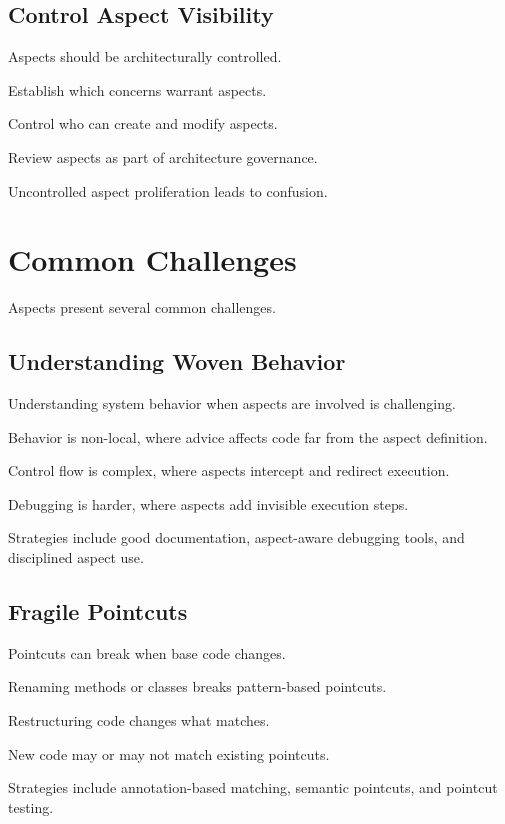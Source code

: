 \documentclass[11pt]{article}
\begin{document}
\subsection{Control Aspect Visibility}

Aspects should be architecturally controlled.

Establish which concerns warrant aspects.

Control who can create and modify aspects.

Review aspects as part of architecture governance.

Uncontrolled aspect proliferation leads to confusion.

\section{Common Challenges}

Aspects present several common challenges.

\subsection{Understanding Woven Behavior}

Understanding system behavior when aspects are involved is challenging.

Behavior is non-local, where advice affects code far from the aspect definition.

Control flow is complex, where aspects intercept and redirect execution.

Debugging is harder, where aspects add invisible execution steps.

Strategies include good documentation, aspect-aware debugging tools, and disciplined aspect use.

\subsection{Fragile Pointcuts}

Pointcuts can break when base code changes.

Renaming methods or classes breaks pattern-based pointcuts.

Restructuring code changes what matches.

New code may or may not match existing pointcuts.

Strategies include annotation-based matching, semantic pointcuts, and pointcut testing.
\end{document}
